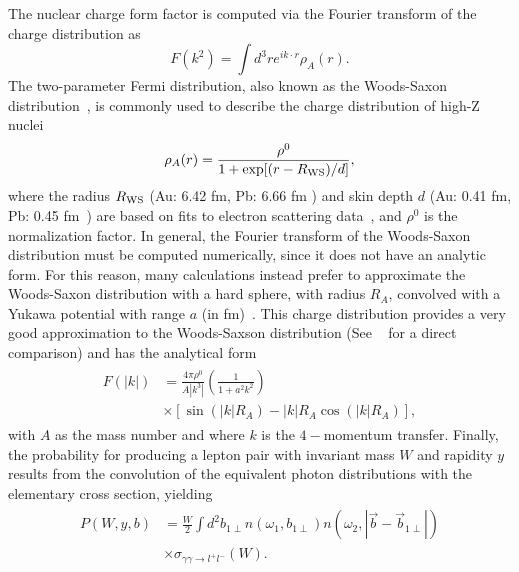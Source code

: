 \documentclass[twocolumn,epjc3]{svjour3}\sloppy
\begin{document}
The nuclear charge form factor is computed via the Fourier transform of the charge distribution as
\begin{equation}
    F(k^2) = \int d^3r e^{ ik \cdot r } \rho_{A}( r ).
\end{equation}
The two-parameter Fermi distribution, also known as the Woods-Saxon distribution~\cite{woodsDiffuseSurfaceOptical1954}, is commonly used to describe the charge distribution of high-Z nuclei
\begin{equation}
    \label{eq:woods-saxon}
            \rho_{A}(r)=\frac{\rho^{0}}{1+\exp[(r-R_{\rm{WS}})/d]},
 \end{equation}
where the radius $R_{\rm{WS}}$ (Au: 6.42 fm, Pb: 6.66 fm ) and skin depth $d$ (Au: 0.41 fm, Pb: 0.45 fm~\cite{shouParameterizationDeformedNuclei2015}) are based on fits to electron scattering data~\cite{barrettNuclearSizesStructure1977,devriesNuclearChargedensitydistributionParameters1987a}, and $\rho^{0}$ is the normalization factor. In general, the Fourier transform of the Woods-Saxon distribution must be computed numerically, since it does not have an analytic form. For this reason, many calculations instead prefer to approximate the Woods-Saxon distribution with a hard sphere, with radius $R_A$, convolved with a Yukawa potential with range $a$ (in fm)~\cite{daviesCalculationMomentsPotentials1976}. This charge distribution provides a very good approximation to the Woods-Saxson distribution (See ~\cite{kleinExclusiveVectorMeson1999a} for a direct comparison) and has the analytical form 
\begin{align}
    \begin{split}
    F(|k|) & =  \frac{4\pi\rho^0}{A |k^3|} \left( \frac{1}{1+a^2k^2} \right) \\
    & \times \left[ \sin{(|k| R_A)} - |k| R_A\cos{(|k| R_A)}  \right] , 
    \end{split}
\end{align}
with $A$ as the mass number and where $k$ is the $4-$momentum transfer. Finally, the probability for producing a lepton pair with invariant mass $W$ and rapidity $y$ results from the convolution of the equivalent photon distributions with the elementary cross section, yielding
\begin{align}
    \begin{split}
    P(W,y,b) & = \frac{W}{2}\int d^{2}b_{1\perp}  n(\omega_{1},b_{1\perp}) n(\omega_{2},|\vec{b} - \vec{b}_{1\perp}|) \\ 
    & \times \sigma_{\gamma \gamma \rightarrow l^{+}l^{-}}(W).
    \label{eq:epa_xs}
  \end{split}
\end{align}
\end{document}
